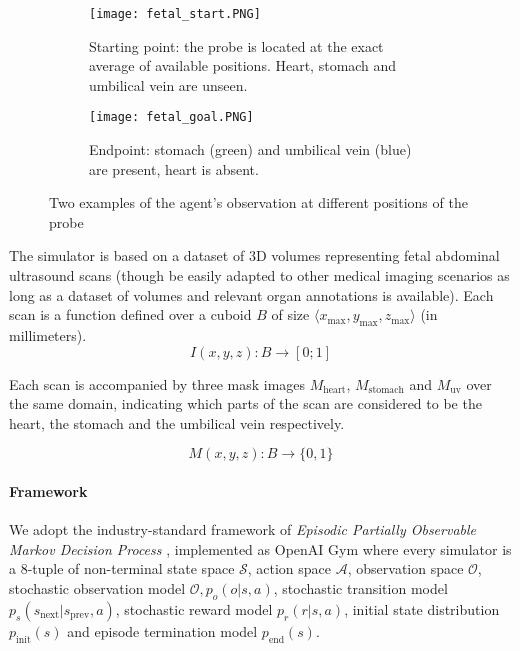 \begin{figure*}
    \centering
    \begin{subfigure}{.45\linewidth}
      \centering
      \texttt{[image: fetal\_start.PNG]}
      \caption{Starting point: the probe is located at the exact average of available positions. Heart, stomach and umbilical vein are unseen.}
      \label{fig:img-before}
    \end{subfigure}%
    \begin{subfigure}{.45\linewidth}
      \centering
      \texttt{[image: fetal\_goal.PNG]}
      \caption{Endpoint: stomach (green) and umbilical vein (blue) are present, heart is absent.}
      \label{fig:img-after}
    \end{subfigure}
    \caption{Two examples of the agent's observation at different positions of the probe}
    \label{fig:imgs}
\end{figure*}

The simulator is based on a dataset of 3D volumes representing fetal abdominal ultrasound scans (though be easily adapted to other medical imaging scenarios as long as a dataset of volumes and relevant organ annotations is available).
Each scan is a function defined over a cuboid $B$ of size $\langle x_\text{max},y_\text{max},z_\text{max} \rangle$ (in millimeters).
\begin{equation}
    I(x,y,z): B \rightarrow [0;1]
\end{equation}

Each scan is accompanied by three mask images $M_\text{heart}$, $M_\text{stomach}$ and $M_\text{uv}$ over the same domain, indicating which parts of the scan are considered to be the heart, the stomach and the umbilical vein respectively.

\begin{equation}
    M(x,y,z): B \rightarrow \{0,1\}
\end{equation}

\paragraph{Framework}

We adopt the industry-standard framework of {\em Episodic Partially Observable Markov Decision Process} \cite{kramerjdavidrPartiallyObservableMarkov1964, spaanPartiallyObservableMarkov2012}, implemented as OpenAI Gym \cite{openai-gym} where every simulator is a 8-tuple of non-terminal state space $\mathcal{S}$, action space $\mathcal{A}$, observation space $\mathcal{O}$, stochastic observation model $\mathcal{O}, p_o(o | s, a)$, stochastic transition model $p_s(s_\text{next} | s_\text{prev}, a)$, stochastic reward model $p_r(r | s, a)$, initial state distribution $p_\text{init}(s)$ and episode termination model $p_\text{end}(s)$.

